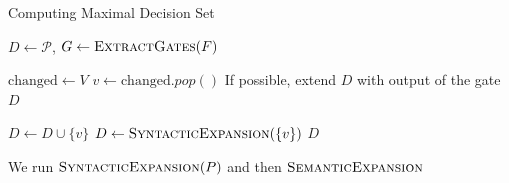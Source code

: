 \documentclass[aspectratio=169]{beamer}
\begin{document}
\begin{frame}{Computing Maximal Decision Set}
  \small
  \begin{algorithmic}[1]
    
    \State $D \gets \mathcal{P}$,  $G \gets \textsc{ExtractGates}(F)$ 
    
    \State $\text{changed} \gets V$
    \State $v \gets \text{changed}.pop()$
     If possible, extend $D$ with output of the gate
    \EndFor
    \EndWhile
    \State \Return $D$
    \EndProcedure
    
        \State $D \gets D \cup \{v\}$
        \State $D \gets \textsc{SyntacticExpansion}(\{v\})$
    \EndIf
    \EndFor
    \State \Return $D$
    \EndProcedure

  \end{algorithmic}
We run $\textsc{SyntacticExpansion}(P)$ and then $\textsc{SemanticExpansion}$
\end{frame}
\end{document}
